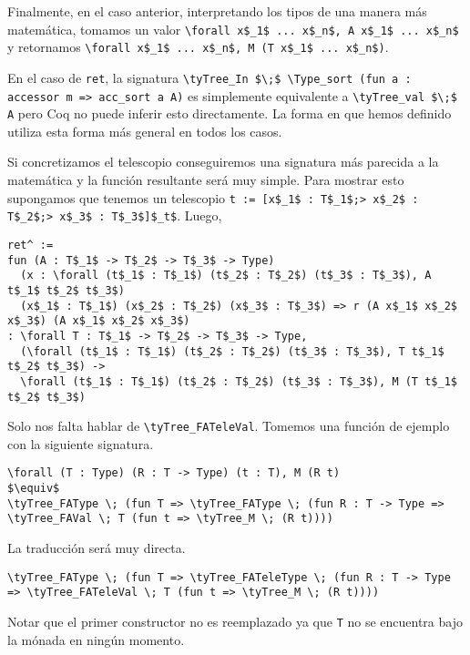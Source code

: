 Finalmente, en el caso anterior, interpretando los tipos de una manera más matemática, tomamos un valor \lstinline{\forall x$_1$ ... x$_n$, A x$_1$ ... x$_n$} y retornamos \lstinline{\forall x$_1$ ... x$_n$, M (T x$_1$ ... x$_n$)}.

En el caso de \lstinline{ret}, la signatura \lstinline{\tyTree_In $\;$ \Type_sort (fun a : accessor m => acc_sort a A)} es simplemente equivalente a \lstinline{\tyTree_val $\;$ A} pero Coq no puede inferir esto directamente.
La forma en que hemos definido \lift{} utiliza esta forma más general en todos los casos.

Si concretizamos el telescopio conseguiremos una signatura más parecida a la matemática y la función resultante será muy simple.
Para mostrar esto supongamos que tenemos un telescopio \lstinline{t := [x$_1$ : T$_1$;> x$_2$ : T$_2$;> x$_3$ : T$_3$]$_t$}. Luego,

\begin{lstlisting}
ret^ :=
fun (A : T$_1$ -> T$_2$ -> T$_3$ -> Type)
  (x : \forall (t$_1$ : T$_1$) (t$_2$ : T$_2$) (t$_3$ : T$_3$), A t$_1$ t$_2$ t$_3$) 
  (x$_1$ : T$_1$) (x$_2$ : T$_2$) (x$_3$ : T$_3$) => r (A x$_1$ x$_2$ x$_3$) (A x$_1$ x$_2$ x$_3$)
: \forall T : T$_1$ -> T$_2$ -> T$_3$ -> Type,
  (\forall (t$_1$ : T$_1$) (t$_2$ : T$_2$) (t$_3$ : T$_3$), T t$_1$ t$_2$ t$_3$) ->
  \forall (t$_1$ : T$_1$) (t$_2$ : T$_2$) (t$_3$ : T$_3$), M (T t$_1$ t$_2$ t$_3$)
\end{lstlisting}

Solo nos falta hablar de \lstinline{\tyTree_FATeleVal}. Tomemos una función de ejemplo con la siguiente signatura.

\begin{lstlisting}
\forall (T : Type) (R : T -> Type) (t : T), M (R t)
$\equiv$
\tyTree_FAType \; (fun T => \tyTree_FAType \; (fun R : T -> Type => \tyTree_FAVal \; T (fun t => \tyTree_M \; (R t))))
\end{lstlisting}

La traducción será muy directa.

\begin{lstlisting}
\tyTree_FAType \; (fun T => \tyTree_FATeleType \; (fun R : T -> Type => \tyTree_FATeleVal \; T (fun t => \tyTree_M \; (R t))))
\end{lstlisting}

Notar que el primer constructor no es reemplazado ya que \lstinline{T} no se encuentra bajo la mónada en ningún momento.

